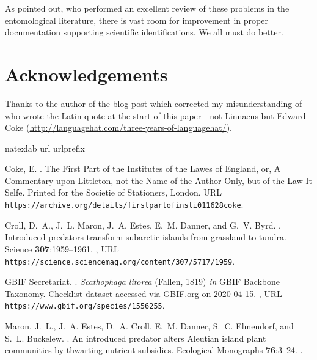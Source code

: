 As \citet{Packeretal2018} pointed out, who performed an excellent review of these problems in the entomological literature, there is vast room for improvement in proper documentation supporting scientific identifications. We all must do better.


\section{Acknowledgements}

Thanks to the author of the blog post which corrected my misunderstanding of who wrote the Latin quote at the start of this paper---not Linnaeus but Edward Coke (\url{http://languagehat.com/three-years-of-languagehat/}).

%

\begin{thebibliography}{8}
\expandafter\ifx\csname natexlab\endcsname\relax\def\natexlab#1{#1}\fi
\expandafter\ifx\csname url\endcsname\relax
  \def\url#1{{\tt #1}}\fi
\expandafter\ifx\csname urlprefix\endcsname\relax\def\urlprefix{{\small URL}
  }\fi

Coke, E.
.
\newblock The First Part of the Institutes of the Lawes of England, or, A
  Commentary upon Littleton, not the Name of the Author Only, but of the Law It
  Selfe.
\newblock Printed for the Societie of Stationers, London.
\newblock
  \urlprefix\url{https://archive.org/details/firstpartofinsti011628coke}.

Croll, D.~A., J.~L. Maron, J.~A. Estes, E.~M. Danner, and G.~V. Byrd.
.
\newblock Introduced predators transform subarctic islands from grassland to
  tundra.
\newblock Science {\bfseries 307}:1959--1961.
\newblock {},
  \urlprefix\url{https://science.sciencemag.org/content/307/5717/1959}.

{GBIF Secretariat}.
.
\newblock \textit{Scathophaga litorea} (Fallen, 1819) \textit{in} GBIF Backbone
  Taxonomy. Checklist dataset accessed via GBIF.org on 2020-04-15.
\newblock {},
  \urlprefix\url{https://www.gbif.org/species/1556255}.

Maron, J.~L., J.~A. Estes, D.~A. Croll, E.~M. Danner, S.~C. Elmendorf, and
  S.~L. Buckelew.
.
\newblock An introduced predator alters {Aleutian} island plant communities by
  thwarting nutrient subsidies.
\newblock Ecological Monographs {\bfseries 76}:3--24.
\newblock {}.


\end{thebibliography}
